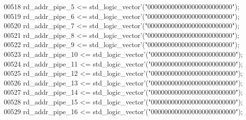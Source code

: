 \begin{DoxyCode}
00518       \textcolor{vhdlchar}{rd_addr_pipe_5} \textcolor{vhdlchar}{<=} \textcolor{comment}{std\_logic\_vector}\textcolor{vhdlchar}{'}\textcolor{vhdlchar}{(}\textcolor{vhdllogic}{"0000000000000000000000000"}\textcolor{vhdlchar}{)};
00519       \textcolor{vhdlchar}{rd_addr_pipe_6} \textcolor{vhdlchar}{<=} \textcolor{comment}{std\_logic\_vector}\textcolor{vhdlchar}{'}\textcolor{vhdlchar}{(}\textcolor{vhdllogic}{"0000000000000000000000000"}\textcolor{vhdlchar}{)};
00520       \textcolor{vhdlchar}{rd_addr_pipe_7} \textcolor{vhdlchar}{<=} \textcolor{comment}{std\_logic\_vector}\textcolor{vhdlchar}{'}\textcolor{vhdlchar}{(}\textcolor{vhdllogic}{"0000000000000000000000000"}\textcolor{vhdlchar}{)};
00521       \textcolor{vhdlchar}{rd_addr_pipe_8} \textcolor{vhdlchar}{<=} \textcolor{comment}{std\_logic\_vector}\textcolor{vhdlchar}{'}\textcolor{vhdlchar}{(}\textcolor{vhdllogic}{"0000000000000000000000000"}\textcolor{vhdlchar}{)};
00522       \textcolor{vhdlchar}{rd_addr_pipe_9} \textcolor{vhdlchar}{<=} \textcolor{comment}{std\_logic\_vector}\textcolor{vhdlchar}{'}\textcolor{vhdlchar}{(}\textcolor{vhdllogic}{"0000000000000000000000000"}\textcolor{vhdlchar}{)};
00523       \textcolor{vhdlchar}{rd_addr_pipe_10} \textcolor{vhdlchar}{<=} \textcolor{comment}{std\_logic\_vector}\textcolor{vhdlchar}{'}\textcolor{vhdlchar}{(}\textcolor{vhdllogic}{"0000000000000000000000000"}\textcolor{vhdlchar}{)};
00524       \textcolor{vhdlchar}{rd_addr_pipe_11} \textcolor{vhdlchar}{<=} \textcolor{comment}{std\_logic\_vector}\textcolor{vhdlchar}{'}\textcolor{vhdlchar}{(}\textcolor{vhdllogic}{"0000000000000000000000000"}\textcolor{vhdlchar}{)};
00525       \textcolor{vhdlchar}{rd_addr_pipe_12} \textcolor{vhdlchar}{<=} \textcolor{comment}{std\_logic\_vector}\textcolor{vhdlchar}{'}\textcolor{vhdlchar}{(}\textcolor{vhdllogic}{"0000000000000000000000000"}\textcolor{vhdlchar}{)};
00526       \textcolor{vhdlchar}{rd_addr_pipe_13} \textcolor{vhdlchar}{<=} \textcolor{comment}{std\_logic\_vector}\textcolor{vhdlchar}{'}\textcolor{vhdlchar}{(}\textcolor{vhdllogic}{"0000000000000000000000000"}\textcolor{vhdlchar}{)};
00527       \textcolor{vhdlchar}{rd_addr_pipe_14} \textcolor{vhdlchar}{<=} \textcolor{comment}{std\_logic\_vector}\textcolor{vhdlchar}{'}\textcolor{vhdlchar}{(}\textcolor{vhdllogic}{"0000000000000000000000000"}\textcolor{vhdlchar}{)};
00528       \textcolor{vhdlchar}{rd_addr_pipe_15} \textcolor{vhdlchar}{<=} \textcolor{comment}{std\_logic\_vector}\textcolor{vhdlchar}{'}\textcolor{vhdlchar}{(}\textcolor{vhdllogic}{"0000000000000000000000000"}\textcolor{vhdlchar}{)};
00529       \textcolor{vhdlchar}{rd_addr_pipe_16} \textcolor{vhdlchar}{<=} \textcolor{comment}{std\_logic\_vector}\textcolor{vhdlchar}{'}\textcolor{vhdlchar}{(}\textcolor{vhdllogic}{"0000000000000000000000000"}\textcolor{vhdlchar}{)};

\end{DoxyCode}
